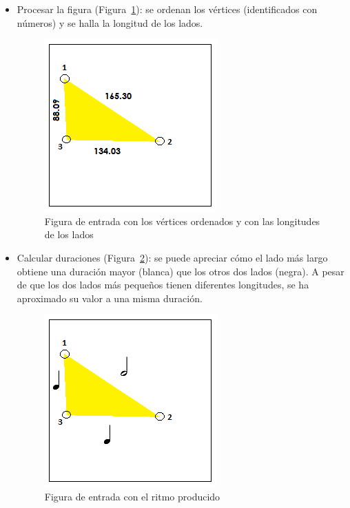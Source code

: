 \begin{itemize}

	\item Procesar la figura (Figura~\ref{fig:Figura1Voz1}): se ordenan los vértices (identificados con números) y se halla la longitud de los lados. \\

		\begin{figure}[!htbp]
		\centering
		\hspace*{0.0in}
		\includegraphics[scale=1.0]{graphics/simpletest1-F1.png}
		\caption{Figura de entrada con los vértices ordenados y con las longitudes de los lados}
		\label{fig:Figura1Voz1}
		\end{figure}

	\item Calcular duraciones (Figura~\ref{fig:Figura2Voz1}): se puede apreciar cómo el lado más largo obtiene una duración mayor (blanca) que los otros dos lados (negra). A pesar de que los dos lados más pequeños tienen diferentes longitudes, se ha aproximado su valor a una misma duración.\\
		
		\begin{figure}[!htbp]
		\centering
		\hspace*{0.0in}
		\includegraphics[scale=1.0]{graphics/simpletest1-F2.png}
		\caption{Figura de entrada con el ritmo producido}
		\label{fig:Figura2Voz1}
		\end{figure}


\end{itemize}
